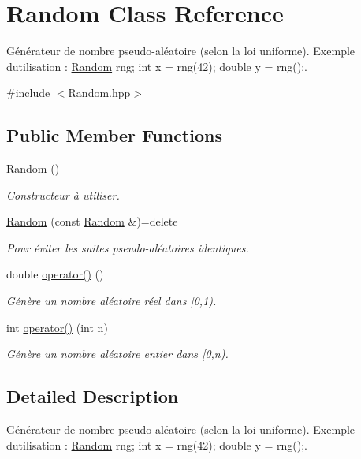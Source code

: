 \hypertarget{classRandom}{}\section{Random Class Reference}
\label{classRandom}


Générateur de nombre pseudo-\/aléatoire (selon la loi uniforme). Exemple d\textquotesingle{}utilisation \+: \hyperlink{classRandom}{Random} rng; int x = rng(42); double y = rng();.  




{\ttfamily \#include $<$Random.\+hpp$>$}

\subsection*{Public Member Functions}
\begin{DoxyCompactItemize}
\item 
\hyperlink{classRandom_acb76b49c3903a3c4fb67fd216341f08d}{Random} ()
\begin{DoxyCompactList}\small\item\em Constructeur à utiliser. \end{DoxyCompactList}\item 
\hyperlink{classRandom_a9bfadeaa4adc5ac44142d000b1c99441}{Random} (const \hyperlink{classRandom}{Random} \&)=delete
\begin{DoxyCompactList}\small\item\em Pour éviter les suites pseudo-\/aléatoires identiques. \end{DoxyCompactList}\item 
double \hyperlink{classRandom_aa0277ecffaf7d920b8ebd2399214f113}{operator()} ()
\begin{DoxyCompactList}\small\item\em Génère un nombre aléatoire réel dans \mbox{[}0,1). \end{DoxyCompactList}\item 
int \hyperlink{classRandom_a20265a86364664d85253931dc4685fa3}{operator()} (int n)
\begin{DoxyCompactList}\small\item\em Génère un nombre aléatoire entier dans \mbox{[}0,n). \end{DoxyCompactList}\end{DoxyCompactItemize}


\subsection{Detailed Description}
Générateur de nombre pseudo-\/aléatoire (selon la loi uniforme). Exemple d\textquotesingle{}utilisation \+: \hyperlink{classRandom}{Random} rng; int x = rng(42); double y = rng();. 

